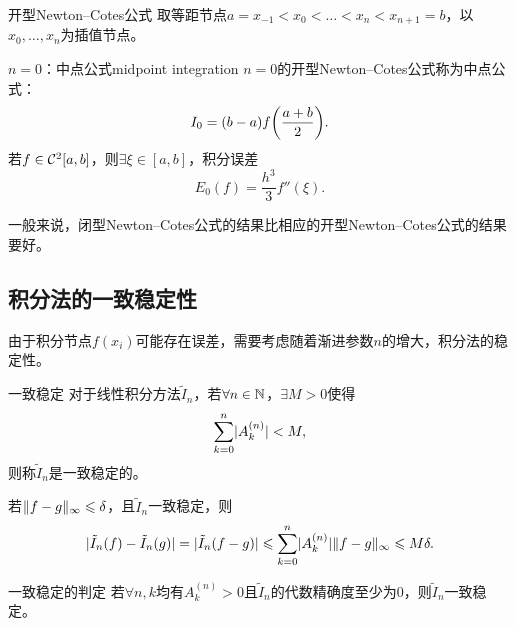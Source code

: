 \begin{theorem}
    {开型Newton--Cotes公式}{}
    取等距节点$a = x_{-1} < x_0 < \ldots < x_n < x_{n+1} = b$，以$x_0,\ldots,x_n$为插值节点。
\end{theorem}

\begin{example}
    {$n = 0$：中点公式}{midpoint integration}
    $n = 0$的开型Newton--Cotes公式称为中点公式：
    \begin{equation}
        \label{eqn:midpoint integration}
        I_0 = (b - a)f\biggl(\frac{a + b}2\biggr).
    \end{equation}
    若$f \in \mathcal{C}^2[a,b]$，则$\exists\xi \in [a,b]$，积分误差
    \begin{equation}
        \label{eqn:midpoint error}
        E_0(f) = \frac{h^3}3f''(\xi).
    \end{equation}
\end{example}

\begin{remark}
    一般来说，闭型Newton--Cotes公式的结果比相应的开型Newton--Cotes公式的结果要好。
\end{remark}

\subsection{积分法的一致稳定性}

由于积分节点$f(x_i)$可能存在误差，需要考虑随着渐进参数$n$的增大，积分法的稳定性。

\begin{definition}
    {一致稳定}{}
    对于线性积分方法$\tilde I_n$，若$\forall n \in \mathbb{N}$，$\exists M > 0$使得
    \begin{equation}
        \sum_{k=0}^n\lvert A_k^{(n)}\rvert < M,
    \end{equation}
    则称$\tilde I_n$是一致稳定的。
\end{definition}

\begin{corollary}
    若$\lVert f - g\rVert_\infty \leqslant \delta$，且$\tilde I_n$一致稳定，则
    \[
        \lvert\tilde I_n(f) - \tilde I_n(g)\rvert = \lvert\tilde I_n(f - g)\rvert \leqslant \sum_{k=0}^n\lvert A_k^{(n)}\rvert\lVert f - g\rVert_\infty \leqslant M\delta.
    \]
\end{corollary}

\begin{theorem}
    {一致稳定的判定}{}
    若$\forall n,k$均有$A_k^{(n)} > 0$且$\tilde I_n$的代数精确度至少为0，则$\tilde I_n$一致稳定。
\end{theorem}


